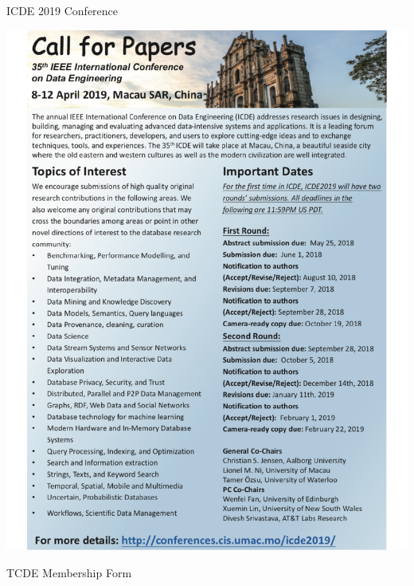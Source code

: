 \documentclass[11pt]{article}
\begin{document}
\begin{bulletin}
\begin{callsection}
%
%
\begin{call}{ICDE 2019 Conference}
\centerline{\includegraphics[width=\textwidth, bb= 0 0 610 790] {calls/icde19.pdf}} 
\end{call}
\begin{call}{TCDE Membership Form}

\end{call}
\end{callsection}
\end{bulletin}
\end{document}
